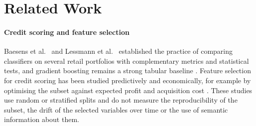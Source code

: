\documentclass[final,5p,twocolumn]{elsarticle}
\begin{document}

\section{Related Work}
\label{sec:related_work}

\paragraph{Credit scoring and feature selection}
Baesens et al.\ \cite{baesens2003} and Lessmann et al.\ \cite{lessmann2015} established the practice of comparing classifiers on several retail portfolios with complementary metrics and statistical tests, and gradient boosting remains a strong tabular baseline \cite{gunnarsson2021}. Feature selection for credit scoring has been studied predictively and economically, for example by optimising the subset against expected profit and acquisition cost \cite{maldonado2017}. These studies use random or stratified splits and do not measure the reproducibility of the subset, the drift of the selected variables over time or the use of semantic information about them.
\end{document}
